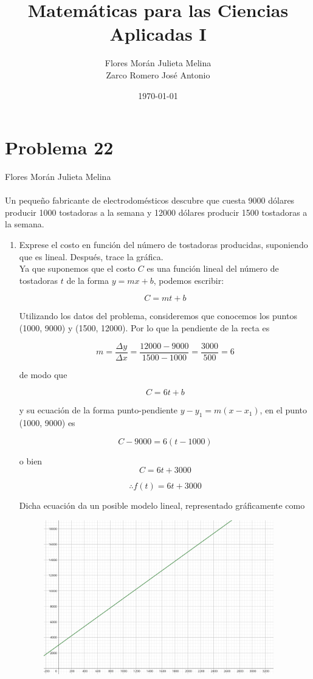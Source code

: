 \documentclass[12pt]{article}
\title{Matemáticas para las Ciencias Aplicadas I}
\date{\today}
\author{Flores Morán Julieta Melina \\ Zarco Romero José Antonio}
\begin{document}
\maketitle


\section{Problema 22}
Flores Morán Julieta Melina \\
\\
Un pequeño fabricante de electrodomésticos descubre que cuesta 9000 dólares producir 1000 tostadoras a la semana y 12000 dólares producir 1500 tostadoras a la semana.
\begin{enumerate}
\item Exprese el costo en función del número de tostadoras producidas, suponiendo que es lineal. Después, trace la gráfica.\\ 

Ya que suponemos que el costo $C$ es una función lineal del número de tostadoras $t$ de la forma $y = mx + b$, podemos escribir:

\[
	C=mt+b
\]

Utilizando los datos del problema, consideremos que conocemos los puntos (1000, 9000) y (1500, 12000). Por lo que la pendiente de la recta es

\[
	 m = \frac{\Delta {y}}{\Delta{x}} = \frac{12000-9000}{1500-1000} = \frac{3000}{500} = 6
\]

de modo que

\[
C=6t+b
\]

y su ecuación de la forma punto-pendiente $y-y_1=m(x-x_1)$, en el punto (1000, 9000) es 

\[
	C-9000=6(t-1000)
\]

o bien
\[
	C=6t+3000
\]

\[
\therefore f(t) = 6t + 3000
\]

Dicha ecuación da un posible modelo lineal, representado gráficamente como
\begin{figure}[h!]
\centering
\includegraphics[width=10cm]{img/tostadoras.png}
\end{figure}


\end{enumerate}
\end{document}
